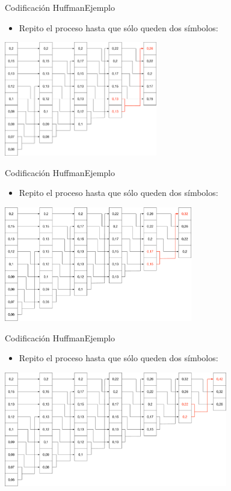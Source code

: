 \documentclass[10pt,compress]{beamer} %
\begin{document}
\begin{frame}{Codificación Huffman}{Ejemplo}
  \begin{itemize}
    \item Repito el proceso hasta que sólo queden dos símbolos:
  \end{itemize}
  \centering \includegraphics[height=5cm]{./Figuras/Huffman4.pdf}
\end{frame}

\begin{frame}{Codificación Huffman}{Ejemplo}
  \begin{itemize}
    \item Repito el proceso hasta que sólo queden dos símbolos:
  \end{itemize}
  \centering \includegraphics[height=5cm]{./Figuras/Huffman5.pdf}
\end{frame}

\begin{frame}{Codificación Huffman}{Ejemplo}
  \begin{itemize}
    \item Repito el proceso hasta que sólo queden dos símbolos:
  \end{itemize}
  \centering \includegraphics[height=5cm]{./Figuras/Huffman6.pdf}
\end{frame}
\end{document}
